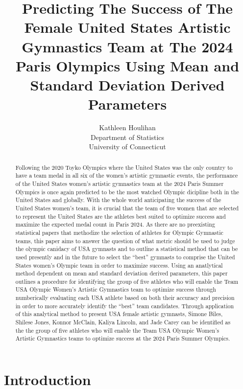 \documentclass[12pt]{article}
\title{Predicting The Success of The Female United States Artistic Gymnastics Team at The 2024 Paris Olympics 
Using Mean and Standard Deviation Derived Parameters}
\author{Kathleen Houlihan\\
  Department of Statistics\\
  University of Connecticut
}
\begin{document}
\maketitle

\begin{abstract}
    
  Following the 2020 Toyko Olympics where the United States was the only country to have a team medal 
  in all six of the women's artistic gymnastic events, the performance of the United States women's artistic 
  gymnastics team at the 2024 Paris Summer Olympics is once again predicted to be the most watched Olympic 
  dicipline both in the United States and globally. With the whole world anticipating the success of the United 
  States women's team, it is crucial that the team of five women that are selected to represent the United States 
  are the athletes best suited to optimize success and maximize the expected medal count in Paris 2024. As there 
  are no preexisting statistical papers that methodize the selection of athletes for Olympic Gymnastic teams, 
  this paper aims to answer the question of what metric should be used to judge the olympic canidacy of USA 
  gymnasts and to outline a statistical method that can be used presently and in the future to select the ``best'' 
  gymnasts to comprise the United States women's Olympic team in order to maximize success. Using an anatlytical 
  method dependent on mean and standard deviation derived parameters, this paper outlines a procedure for identifying 
  the group of five athletes who will enable the Team USA Olympic Women’s Artistic Gymnastics team to optimize 
  success through numberically evaluating each USA athlete based on both their accuracy and precision in order to 
  more accurately identify the ``best'' team candidates. Through application of this analytical method to present 
  USA female artistic gymnasts, Simone Biles, Shilese Jones, Konnor McClain, Kaliya Lincoln, and Jade Carey can be 
  identified as the the group of five athletes who will enable the Team USA Olympic Women’s Artistic Gymnastics 
  teams to optimize success at the 2024 Paris Summer Olympics.

\end{abstract}

\section{Introduction}
\label{sec:intro}
\end{document}
